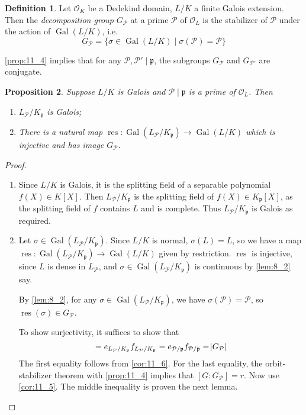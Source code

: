 \documentclass[11pt]{article}
\theoremstyle{definition}
\newtheorem{definition}{Definition}[subsection]
\theoremstyle{plain}
\newtheorem{proposition}[definition]{Proposition}
\theoremstyle{remark}
\DeclareMathOperator{\Gal}{Gal}
\DeclareMathOperator{\res}{res}
\newcommand{\cO}{\mathcal{O}}
\newcommand{\cP}{\mathcal{P}}
\newcommand{\fp}{\mathfrak{p}}
\begin{document}
\begin{definition}\label{def:11_7}
    Let $\cO_K$ be a Dedekind domain, $L/K$ a finite Galois extension. Then the \emph{decomposition group} $G_\cP$ at a prime $\cP$ of $\cO_L$ is the stabilizer of $\cP$ under the action of $\Gal(L/K)$, i.e.
    \begin{equation*}
        G_\cP = \{\sigma \in \Gal(L/K) \mid \sigma(\cP) = \cP\}
    \end{equation*}
\end{definition}

\autoref{prop:11_4} implies that for any $\cP, \cP' \mid \fp$, the subgroups $G_\cP$ and $G_{\cP'}$ are conjugate.

\begin{proposition}\label{prop:11_8}
    Suppose $L / K$ is Galois and $\cP \mid \fp$ is a prime of $\cO_L$. Then
    \begin{enumerate}
        \item $L_\cP / K_\fp$ is Galois;
        \item There is a natural map $\res : \Gal(L_\cP / K_\fp) \to \Gal(L / K)$ which is injective and has image $G_\cP$.
    \end{enumerate}
\end{proposition}
\begin{proof}\phantom{}
    \begin{enumerate}
        \item Since $L/K$ is Galois, it is the splitting field of  a separable polynomial $f(X) \in K[X]$. Then $L_\cP / K_\fp$ is the splitting field of $f(X) \in K_\fp[X]$, as the splitting field of $f$ contains $L$ and is complete. Thus $L_\cP / K_\fp$ is Galois as required.

        \item Let $\sigma \in \Gal(L_\cP / K_\fp)$. Since $L / K$ is normal, $\sigma(L) = L$, so we have a map $\res : \Gal(L_\cP / K_\fp) \to \Gal(L / K)$ given by restriction. $\res$ is injective, since $L$ is dense in $L_\cP$, and $\sigma \in \Gal(L_\cP / K_\fp)$ is continuous by \autoref{lem:8_2} say.

            By \autoref{lem:8_2}, for any $\sigma \in \Gal(L_\cP / K_\fp)$, we have $\sigma(\cP) = \cP$, so $\res(\sigma) \in G_\cP$.

            To show surjectivity, it suffices to show that
            \begin{equation*}
                [L_\cP : K_\fp] = e_{L_\cP / K_\fp} f_{L_\cP / K_\fp} = e_{\cP / \fp} f_{\cP / \fp} = \abs{G_\cP}
            \end{equation*}
            The first equality follows from \autoref{cor:11_6}. For the last equality, the orbit-stabilizer theorem with \autoref{prop:11_4} implies that $[G : G_\cP] = r$. Now use \autoref{cor:11_5}. The middle inequality is proven the next lemma. \qedhere
    \end{enumerate}
\end{proof}
\end{document}

